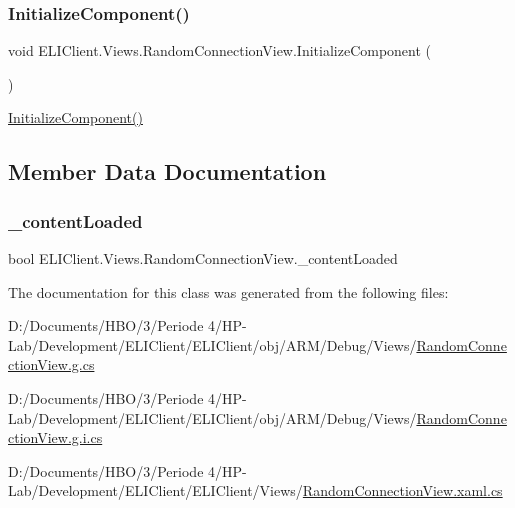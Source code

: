 \subsubsection{\texorpdfstring{Initialize\+Component()}{InitializeComponent()}\hspace{0.1cm}{\footnotesize\ttfamily [3/3]}}
{\footnotesize\ttfamily void E\+L\+I\+Client.\+Views.\+Random\+Connection\+View.\+Initialize\+Component (\begin{DoxyParamCaption}{ }\end{DoxyParamCaption})\hspace{0.3cm}{\ttfamily [inline]}}



\hyperlink{class_e_l_i_client_1_1_views_1_1_random_connection_view_a64aed3e5ad3626eecf77464df5d0f123}{Initialize\+Component()} 



\subsection{Member Data Documentation}
\mbox{\label{class_e_l_i_client_1_1_views_1_1_random_connection_view_acfb9bf9b0d8a09e90981f453a1a108f3}} 
\subsubsection{\texorpdfstring{\+\_\+content\+Loaded}{\_contentLoaded}}
{\footnotesize\ttfamily bool E\+L\+I\+Client.\+Views.\+Random\+Connection\+View.\+\_\+content\+Loaded\hspace{0.3cm}{\ttfamily [private]}}



The documentation for this class was generated from the following files\+:\begin{DoxyCompactItemize}
\item 
D\+:/\+Documents/\+H\+B\+O/3/\+Periode 4/\+H\+P-\/\+Lab/\+Development/\+E\+L\+I\+Client/\+E\+L\+I\+Client/obj/\+A\+R\+M/\+Debug/\+Views/\hyperlink{_a_r_m_2_debug_2_views_2_random_connection_view_8g_8cs}{Random\+Connection\+View.\+g.\+cs}\item 
D\+:/\+Documents/\+H\+B\+O/3/\+Periode 4/\+H\+P-\/\+Lab/\+Development/\+E\+L\+I\+Client/\+E\+L\+I\+Client/obj/\+A\+R\+M/\+Debug/\+Views/\hyperlink{_a_r_m_2_debug_2_views_2_random_connection_view_8g_8i_8cs}{Random\+Connection\+View.\+g.\+i.\+cs}\item 
D\+:/\+Documents/\+H\+B\+O/3/\+Periode 4/\+H\+P-\/\+Lab/\+Development/\+E\+L\+I\+Client/\+E\+L\+I\+Client/\+Views/\hyperlink{_random_connection_view_8xaml_8cs}{Random\+Connection\+View.\+xaml.\+cs}\end{DoxyCompactItemize}
